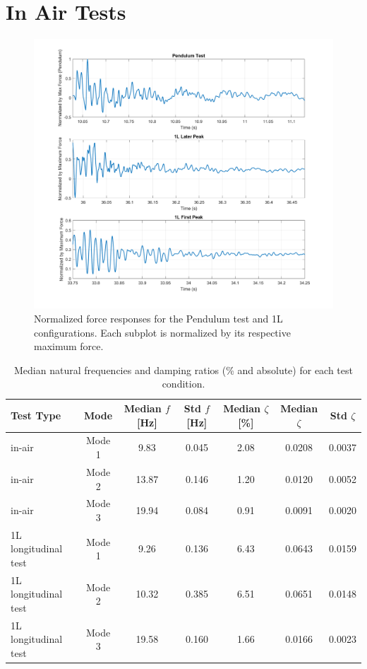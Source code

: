 \documentclass{article}
\begin{document}
\section{In Air Tests} 

\begin{figure}[ht]
    \centering
    \includegraphics[width=\linewidth]{figures/plot_normalized_forces_in_air_vs_in_water_zoom.png}
    \caption{Normalized force responses for the Pendulum test and 1L configurations. Each subplot is normalized by its respective maximum force.}
    \label{fig:normalized_forces}
\end{figure}


\begin{table}[ht]
\centering
\begin{tabular}{l c c c c c c}
\hline
Test Type & Mode & Median $f$ [Hz] & Std $f$ [Hz] & Median $\zeta$ [\%] & Median $\zeta$ & Std $\zeta$ \\
\hline
in-air & Mode 1 & 9.83 & 0.045 & 2.08 & 0.0208 & 0.0037 \\
in-air & Mode 2 & 13.87 & 0.146 & 1.20 & 0.0120 & 0.0052 \\
in-air & Mode 3 & 19.94 & 0.084 & 0.91 & 0.0091 & 0.0020 \\
1L longitudinal test & Mode 1 & 9.26 & 0.136 & 6.43 & 0.0643 & 0.0159 \\
1L longitudinal test & Mode 2 & 10.32 & 0.385 & 6.51 & 0.0651 & 0.0148 \\
1L longitudinal test & Mode 3 & 19.58 & 0.160 & 1.66 & 0.0166 & 0.0023 \\
\hline
\end{tabular}
\caption{Median natural frequencies and damping ratios (\% and absolute) for each test condition.}
\label{tab:mode_summary}
\end{table}
\end{document}

